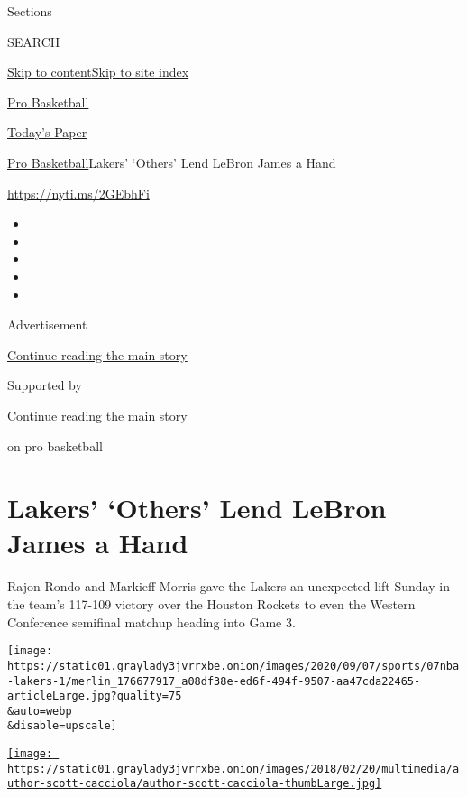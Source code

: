 Sections

SEARCH

\protect\hyperlink{site-content}{Skip to
content}\protect\hyperlink{site-index}{Skip to site index}

\href{https://www.nytimes3xbfgragh.onion/section/sports/basketball}{Pro
Basketball}

\href{https://myaccount.nytimes3xbfgragh.onion/auth/login?response_type=cookie\&client_id=vi}{}

\href{https://www.nytimes3xbfgragh.onion/section/todayspaper}{Today's
Paper}

\href{/section/sports/basketball}{Pro Basketball}\textbar{}Lakers'
`Others' Lend LeBron James a Hand

\url{https://nyti.ms/2GEbhFi}

\begin{itemize}
\item
\item
\item
\item
\item
\end{itemize}

Advertisement

\protect\hyperlink{after-top}{Continue reading the main story}

Supported by

\protect\hyperlink{after-sponsor}{Continue reading the main story}

on pro basketball

\hypertarget{lakers-others-lend-lebron-james-a-hand}{%
\section{Lakers' `Others' Lend LeBron James a
Hand}\label{lakers-others-lend-lebron-james-a-hand}}

Rajon Rondo and Markieff Morris gave the Lakers an unexpected lift
Sunday in the team's 117-109 victory over the Houston Rockets to even
the Western Conference semifinal matchup heading into Game 3.

\texttt{[image: https://static01.graylady3jvrrxbe.onion/images/2020/09/07/sports/07nba-lakers-1/merlin\_176677917\_a08df38e-ed6f-494f-9507-aa47cda22465-articleLarge.jpg?quality=75\\\&auto=webp\\\&disable=upscale]}

\href{https://www.nytimes3xbfgragh.onion/by/scott-cacciola}{\texttt{[image: https://static01.graylady3jvrrxbe.onion/images/2018/02/20/multimedia/author-scott-cacciola/author-scott-cacciola-thumbLarge.jpg]}}

